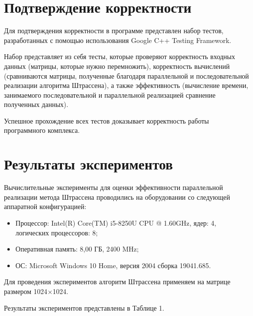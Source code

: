 \documentclass{report}
\begin{document}
\section*{Подтверждение корректности}
Для подтверждения корректности в программе представлен набор тестов, разработанных с помощью использования Google C++ Testing Framework.
\par Набор представляет из себя тесты, которые проверяют корректность входных данных (матрицы, которые нужно перемножить), корректность вычислений (сравниваются матрицы, полученные благодаря параллельной и последовательной реализации алгоритма Штрассена), а также эффективность (вычисление времени, занимаемого последовательной и параллельной реализацией сравнение полученных данных).
\par Успешное прохождение всех тестов доказывает корректность работы программного комплекса.
\newpage

\section*{Результаты экспериментов}
Вычислительные эксперименты для оценки эффективности параллельной реализации метода Штрассена проводились на оборудовании со следующей аппаратной конфигурацией:

\begin{itemize}
\item Процессор: Intel(R) Core(TM) i5-8250U CPU @ 1.60GHz, ядер: 4, логических процессоров: 8;
\item Оперативная память: 8,00 ГБ, 2400 MHz;
\item ОС: Microsoft Windows 10 Home, версия 2004 сборка 19041.685.
\end{itemize}

\par Для проведения экспериментов алгоритм Штрассена применяем на матрице размером 1024$\times$1024.
\par Результаты экспериментов представлены в Таблице 1.
\end{document}
